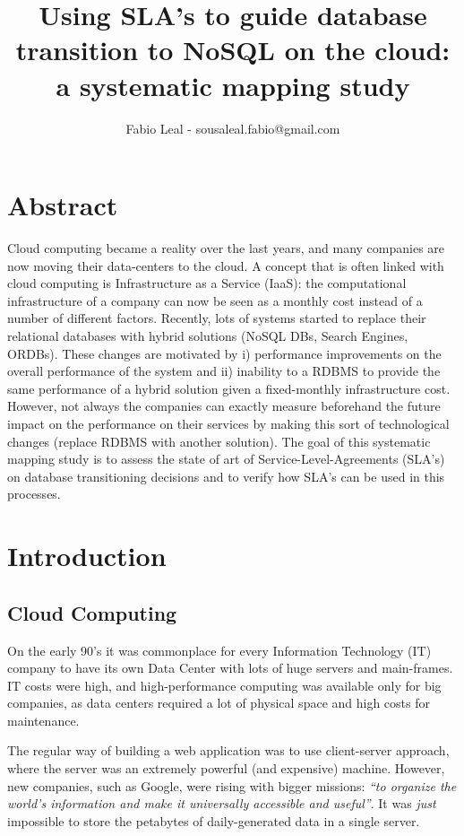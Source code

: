 \documentclass{article}
\begin{document}
\title{Using SLA’s to guide database transition to NoSQL on the cloud: a systematic mapping study}
\author{Fabio Leal - sousaleal.fabio@gmail.com}
\maketitle  





\section{Abstract}
Cloud computing became a reality over the last years, and many companies are now moving their data-centers to the cloud. A concept that is often linked with cloud computing is Infrastructure as a Service (IaaS): the computational infrastructure of a company can now be seen as a monthly cost instead of a number of different factors. Recently, lots of systems started to replace their relational databases with hybrid solutions (NoSQL DBs, Search Engines, ORDBs). These changes are motivated by i) performance improvements on the overall performance of the system and ii) inability to a RDBMS to provide the same performance of a hybrid solution given a fixed-monthly infrastructure cost. However, not always the companies can exactly measure beforehand the future impact on the performance on their services by making this sort of technological changes (replace RDBMS with another solution). The goal of this systematic mapping study is to assess the state of art of Service-Level-Agreements (SLA’s) on database transitioning decisions and to verify how SLA’s can be used in this processes.

\section{Introduction}
\subsection{Cloud Computing}
On the early 90's it was commonplace for every Information Technology (IT) company to have its own Data Center with lots of huge servers and main-frames. IT costs were high, and high-performance computing was available only for big companies, as data centers required a lot of physical space and high costs for maintenance. 

The regular way of building a web application was to use client-server approach, where the server was an extremely powerful (and expensive) machine. However, new companies, such as Google, were rising with bigger missions: \textit{``to organize the world's information and make it universally accessible and useful''}. It was \textit{just} impossible to store the petabytes of daily-generated data in a single server. 
\end{document}
